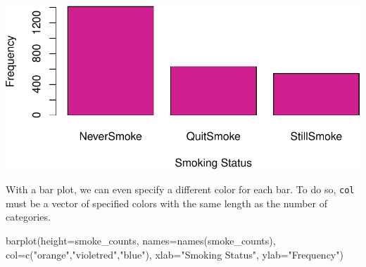 \documentclass[
  letterpaper,
]{krantz}
\makeatletter
\newenvironment{Shaded}{\begin{snugshade}}{\end{snugshade}}
\newcommand{\AttributeTok}[1]{\textcolor[rgb]{0.40,0.45,0.13}{#1}}
\newcommand{\FunctionTok}[1]{\textcolor[rgb]{0.28,0.35,0.67}{#1}}
\newcommand{\NormalTok}[1]{\textcolor[rgb]{0.00,0.23,0.31}{#1}}
\newcommand{\OtherTok}[1]{\textcolor[rgb]{0.00,0.23,0.31}{#1}}
\newcommand{\SpecialCharTok}[1]{\textcolor[rgb]{0.37,0.37,0.37}{#1}}
\newcommand{\StringTok}[1]{\textcolor[rgb]{0.13,0.47,0.30}{#1}}
\newenvironment{kframe}{%
\medskip{}
\setlength{\fboxsep}{.8em}
 \def\at@end@of@kframe{}%
 \ifinner\ifhmode%
  \def\at@end@of@kframe{\end{minipage}}%
  \begin{minipage}{\columnwidth}%
 \fi\fi%
 \def\FrameCommand##1{\hskip\@totalleftmargin \hskip-\fboxsep
 \colorbox{shadecolor}{##1}\hskip-\fboxsep
     \hskip-\linewidth \hskip-\@totalleftmargin \hskip\columnwidth}%
 \MakeFramed {\advance\hsize-\width
   \@totalleftmargin\z@ \linewidth\hsize
   \@setminipage}}%
 {\par\unskip\endMakeFramed%
 \at@end@of@kframe}
\renewenvironment{Shaded}{\begin{kframe}}{\end{kframe}}
\makeatother
\begin{document}
\begin{Shaded}
\end{Shaded}

\begin{center}
\includegraphics[width=1\textwidth,height=\textheight]{book/exploratory_analysis_files/figure-pdf/unnamed-chunk-10-1.pdf}
\end{center}

With a bar plot, we can even specify a different color for each bar. To
do so, \texttt{col} must be a vector of specified colors with the same
length as the number of categories.

\begin{Shaded}
\begin{Highlighting}[]
\FunctionTok{barplot}\NormalTok{(}\AttributeTok{height=}\NormalTok{smoke\_counts, }\AttributeTok{names=}\FunctionTok{names}\NormalTok{(smoke\_counts), }
        \AttributeTok{col=}\FunctionTok{c}\NormalTok{(}\StringTok{"orange"}\NormalTok{,}\StringTok{"violetred"}\NormalTok{,}\StringTok{"blue"}\NormalTok{),}
        \AttributeTok{xlab=}\StringTok{"Smoking Status"}\NormalTok{, }\AttributeTok{ylab=}\StringTok{"Frequency"}\NormalTok{)}
\end{Highlighting}
\end{Shaded}
\end{document}
